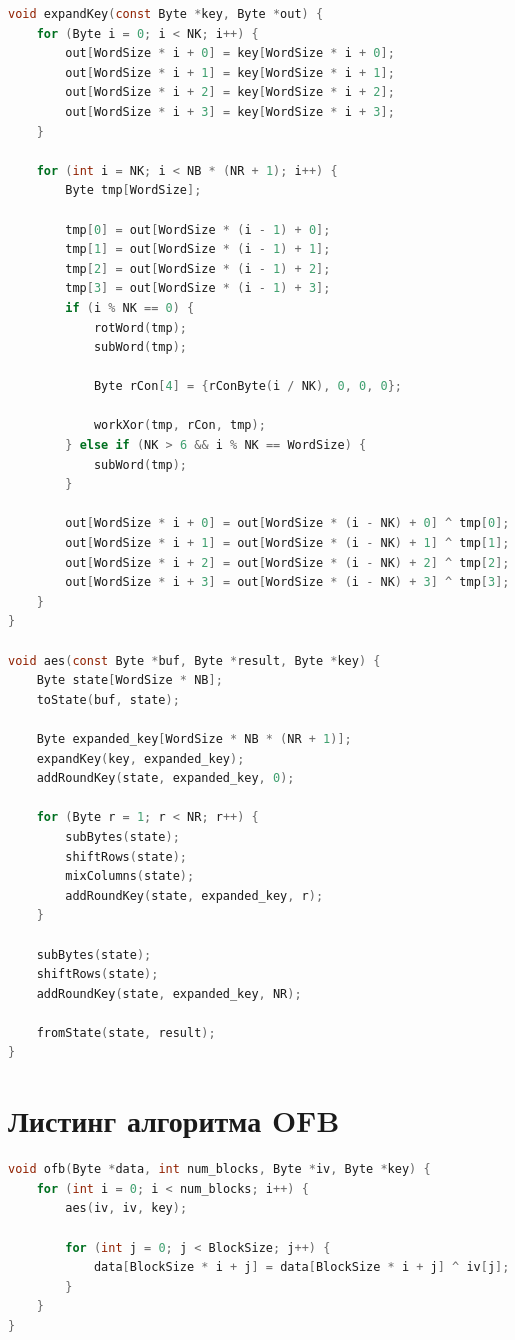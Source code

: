 \begin{lstlisting}[language=C, label=lst:aes, caption={Реализация алгоритма AES}]
void expandKey(const Byte *key, Byte *out) {
    for (Byte i = 0; i < NK; i++) {
        out[WordSize * i + 0] = key[WordSize * i + 0];
        out[WordSize * i + 1] = key[WordSize * i + 1];
        out[WordSize * i + 2] = key[WordSize * i + 2];
        out[WordSize * i + 3] = key[WordSize * i + 3];
    }

    for (int i = NK; i < NB * (NR + 1); i++) {
        Byte tmp[WordSize];

        tmp[0] = out[WordSize * (i - 1) + 0];
        tmp[1] = out[WordSize * (i - 1) + 1];
        tmp[2] = out[WordSize * (i - 1) + 2];
        tmp[3] = out[WordSize * (i - 1) + 3];
        if (i % NK == 0) {
            rotWord(tmp);
            subWord(tmp);

            Byte rCon[4] = {rConByte(i / NK), 0, 0, 0};

            workXor(tmp, rCon, tmp);
        } else if (NK > 6 && i % NK == WordSize) {
            subWord(tmp);
        }

        out[WordSize * i + 0] = out[WordSize * (i - NK) + 0] ^ tmp[0];
        out[WordSize * i + 1] = out[WordSize * (i - NK) + 1] ^ tmp[1];
        out[WordSize * i + 2] = out[WordSize * (i - NK) + 2] ^ tmp[2];
        out[WordSize * i + 3] = out[WordSize * (i - NK) + 3] ^ tmp[3];
    }
}

void aes(const Byte *buf, Byte *result, Byte *key) {
    Byte state[WordSize * NB];
    toState(buf, state);

    Byte expanded_key[WordSize * NB * (NR + 1)];
    expandKey(key, expanded_key);
    addRoundKey(state, expanded_key, 0);

    for (Byte r = 1; r < NR; r++) {
        subBytes(state);
        shiftRows(state);
        mixColumns(state);
        addRoundKey(state, expanded_key, r);
    }

    subBytes(state);
    shiftRows(state);
    addRoundKey(state, expanded_key, NR);

    fromState(state, result);
}\end{lstlisting}

\section{Листинг алгоритма OFB}

\begin{lstlisting}[language=C, label=lst:ofb, caption={Реализация алгоритма OFB}]
void ofb(Byte *data, int num_blocks, Byte *iv, Byte *key) {
    for (int i = 0; i < num_blocks; i++) {
        aes(iv, iv, key);

        for (int j = 0; j < BlockSize; j++) {
            data[BlockSize * i + j] = data[BlockSize * i + j] ^ iv[j];
        }
    }
}
\end{lstlisting}	

